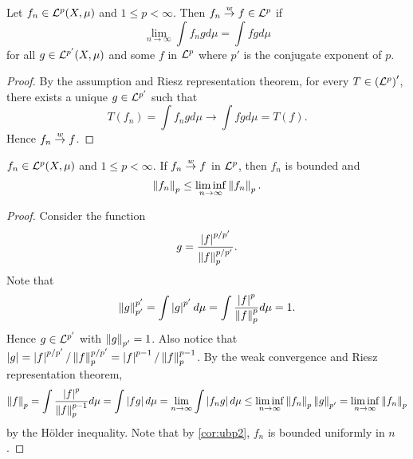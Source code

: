 \begin{proposition}
    Let $f_n\in\mathcal{L}^p(X,\mu)$ and $1\leq p<\infty$. Then $f_n\overset{w}{\to} f\in\mathcal{L}^p$ if 
    \begin{equation*}
        \lim_{n\to\infty} \int f_ngd\mu = \int fgd\mu
    \end{equation*}
    for all $g\in\mathcal{L}^{p'}(X,\mu)$ and some $f$ in $\mathcal{L}^p$ where $p'$ is the 
    conjugate exponent of $p$.
\end{proposition}
\begin{proof}
    By the assumption and Riesz representation theorem, for every 
    $T\in\pth{\L^p}'$, there exists a unique $g\in\mathcal{L}^{p'}$ such that 
    \begin{equation*}
        T(f_n) = \int f_ngd\mu \to \int fgd\mu = T(f).
    \end{equation*}
    Hence $f_n\overset{w}{\to} f$.
\end{proof}

\begin{proposition}\label{prop:weak_conv_bd}
    $f_n\in\mathcal{L}^p(X,\mu)$ and $1\leq p<\infty$. If $f_n\overset{w}{\to} f$ in $\mathcal{L}^p$, 
    then $f_n$ is bounded and 
    \begin{equation*}
        \left\lVert {f_n} \right\rVert_p\leq \liminf_{n\to\infty}\left\lVert {f_n} \right\rVert_p.
    \end{equation*}
\end{proposition}
\begin{proof}
    Consider the function 
    \begin{equation*}
        g = \frac{\left\lvert {f} \right\rvert^{p/p'}}{\left\lVert {f} \right\rVert_p^{p/p'}}.
    \end{equation*}
    Note that 
    \begin{equation*}
        \left\lVert {g} \right\rVert_{p'}^{p'} = \int \left\lvert {g} \right\rvert^{p'}d\mu 
        = \int \frac{\left\lvert {f} \right\rvert^p}{\left\lVert {f} \right\rVert_p^p}d\mu = 1.
    \end{equation*}
    Hence $g\in\mathcal{L}^{p'}$ with $\left\lVert {g} \right\rVert_{p'} = 1$. Also notice 
    that $\left\lvert {g} \right\rvert = \left\lvert {f} \right\rvert^{p/p'}/\left\lVert {f} \right\rVert_p^{p/p'} 
    = \left\lvert {f} \right\rvert^{p-1}/\left\lVert {f} \right\rVert_p^{p-1}$. By the weak convergence 
    and Riesz representation theorem, 
    \begin{equation*}
        \begin{split}
            \left\lVert {f} \right\rVert_p = \int \frac{\left\lvert {f} \right\rvert^p}{\left\lVert {f} \right\rVert_p^{p-1}}d\mu 
            = \int \left\lvert {fg} \right\rvert d\mu = \lim_{n\to\infty}\int \left\lvert {f_ng} \right\rvert d\mu
            \leq \liminf_{n\to\infty}\left\lVert {f_n} \right\rVert_p\left\lVert {g} \right\rVert_{p'} 
            = \liminf_{n\to\infty}\left\lVert {f_n} \right\rVert_p
        \end{split}
    \end{equation*}
    by the H\"older inequality. Note that by \cref{cor:ubp2}, $f_n$ 
    is bounded uniformly in $n$.
\end{proof}

